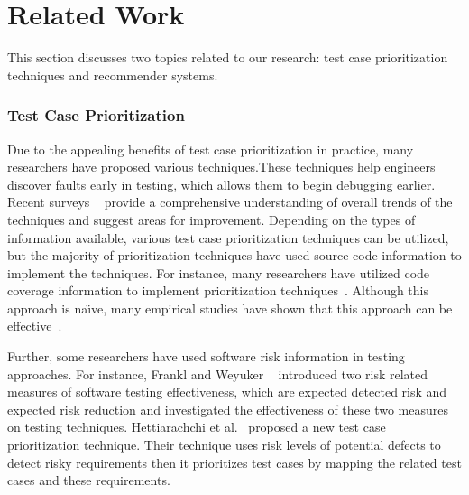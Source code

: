 \vspace*{2pt}
\section{Related Work}
\label{sec:related-work}

This section discusses two topics related to our research:
test case prioritization techniques and recommender systems.

\subsubsection*{Test Case Prioritization}
Due to the appealing benefits of test case prioritization in practice, 
many researchers have proposed various  
techniques.These techniques help engineers discover faults
early in testing, which allows them to begin debugging earlier.
Recent surveys ~\cite{catal13, marksurvey} provide a comprehensive 
understanding of overall trends of the techniques and suggest areas for improvement.
Depending on the types of information available, various test case
prioritization techniques can be utilized, but 
the majority of prioritization techniques have used source code
information to implement the techniques.
For instance, many researchers have utilized code coverage information
to implement prioritization techniques~\cite{elbaum02feb, kim02may,rothermel01oct}. 
Although this approach is na\"{\i}ve, many empirical
studies have shown that this approach can be effective~\cite{cost3, 
cost1, Malishevsky02, myra}.

Further, some researchers have used software risk information in testing approaches.  
For instance, Frankl and Weyuker ~\cite{weyuker} introduced two risk related measures of 
software testing effectiveness, which are expected detected risk and expected risk reduction
and investigated the effectiveness of these two measures on testing techniques. 
Hettiarachchi et al.~\cite{risk} proposed a new test case
prioritization technique. Their technique uses risk levels of potential defects
to detect risky requirements then it prioritizes test cases by mapping the related 
test cases and these requirements.


